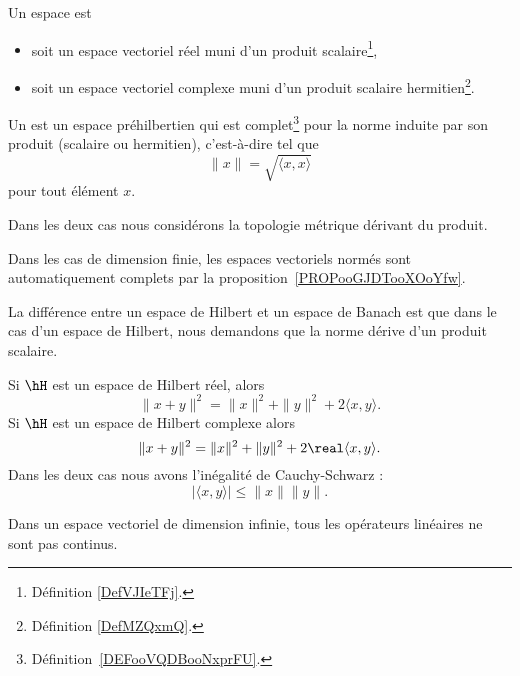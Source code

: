 \begin{definition}  \label{DefORuBdBN}
	Un espace  est
	\begin{itemize}
		\item soit un espace vectoriel réel muni d'un produit scalaire\footnote{Définition \ref{DefVJIeTFj}.},
		\item soit un espace vectoriel complexe muni d'un produit scalaire hermitien\footnote{Définition \ref{DefMZQxmQ}.}.
	\end{itemize}
	Un  est un espace préhilbertien qui est complet\footnote{Définition~\ref{DEFooVQDBooNxprFU}.} pour la norme induite par son produit (scalaire ou hermitien), c'est-à-dire tel que
	\begin{equation}
		\| x \|=\sqrt{ \langle x, x\rangle  }
	\end{equation}
	pour tout élément \( x\).

	Dans les deux cas nous considérons la topologie métrique dérivant du produit.
\end{definition}

Dans les cas de dimension finie, les espaces vectoriels normés sont automatiquement complets par la proposition~\ref{PROPooGJDTooXOoYfw}.

La différence entre un espace de Hilbert et un espace de Banach est que dans le cas d'un espace de Hilbert, nous demandons que la norme dérive d'un produit scalaire.

\begin{proposition}     \label{PropTdupIG}
	Si \( \hH\) est un espace de Hilbert réel, alors
	\begin{equation}
		\| x+y \|^2=\| x \|^2+\| y \|^2+2\langle x, y\rangle .
	\end{equation}
	Si \( \hH\) est un espace de Hilbert complexe alors
	\begin{equation}        \label{EqrbBlkK}
		\| x+y \|^2=\| x \|^2+\| y \|^2+2\real\langle x, y\rangle .
	\end{equation}
	Dans les deux cas nous avons l'inégalité de Cauchy-Schwarz :
	\begin{equation}
		| \langle x, y\rangle  |\leq \| x \|\| y \|.
	\end{equation}
\end{proposition}

Dans un espace vectoriel de dimension infinie, tous les opérateurs linéaires ne sont pas continus.

